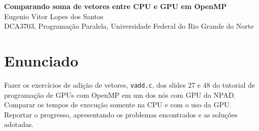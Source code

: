 \documentclass[11pt,letterpaper]{article}
\begin{document}
\pagestyle{plain}
\begin{center}
{\LARGE\bfseries Comparando soma de vetores entre CPU e GPU em OpenMP}\\[0.4em]
{\normalsize Eugenio Vitor Lopes dos Santos}\\[0.3em]
{\small DCA3703, Programação Paralela, Universidade Federal do Rio Grande do Norte}
\end{center}



\section{Enunciado}
Fazer os exercícios de adição de vetores, \texttt{vadd.c}, dos slides 27 e 48 do tutorial de programação de GPUs com OpenMP em um dos nós com GPU do NPAD. Comparar os tempos de execução somente na CPU e com o uso da GPU. Reportar o progresso, apresentando os problemas encontrados e as soluções adotadas.
\end{document}
